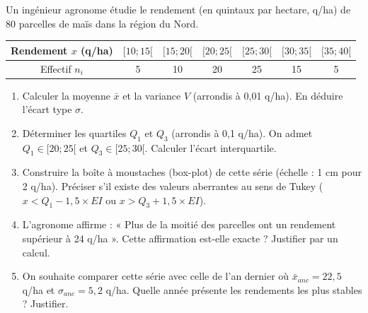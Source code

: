 \documentclass[11pt]{article}
\begin{document}
\begin{exercice}
\label{exo:mais}
Un ingénieur agronome étudie le rendement (en quintaux par hectare, q/ha) de 80 parcelles de maïs dans la région du Nord.

\begin{center}
\begin{tabular}{|c|c|c|c|c|c|c|}
\hline
Rendement $x$ (q/ha) & $[10; 15[$ & $[15; 20[$ & $[20; 25[$ & $[25; 30[$ & $[30; 35[$ & $[35; 40[$ \\ \hline
Effectif $n_i$ & 5 & 10 & 20 & 25 & 15 & 5 \\ \hline
\end{tabular}
\end{center}

\begin{enumerate}
    \item Calculer la moyenne $\bar{x}$ et la variance $V$ (arrondis à 0,01 q/ha). En déduire l'écart type $\sigma$.
    \item Déterminer les quartiles $Q_1$ et $Q_3$ (arrondis à 0,1 q/ha). On admet $Q_1 \in [20; 25[$ et $Q_3 \in [25; 30[$. Calculer l'écart interquartile.
    \item Construire la boîte à moustaches (box-plot) de cette série (échelle : 1 cm pour 2 q/ha). Préciser s'il existe des valeurs aberrantes au sens de Tukey ($x < Q_1 - 1,5 \times EI$ ou $x > Q_3 + 1,5 \times EI$).
    \item L'agronome affirme : « Plus de la moitié des parcelles ont un rendement supérieur à 24 q/ha ». Cette affirmation est-elle exacte ? Justifier par un calcul.
    \item On souhaite comparer cette série avec celle de l'an dernier où $\bar{x}_{anc} = 22,5$ q/ha et $\sigma_{anc} = 5,2$ q/ha. Quelle année présente les rendements les plus stables ? Justifier.
\end{enumerate}
\end{exercice}
\end{document}

